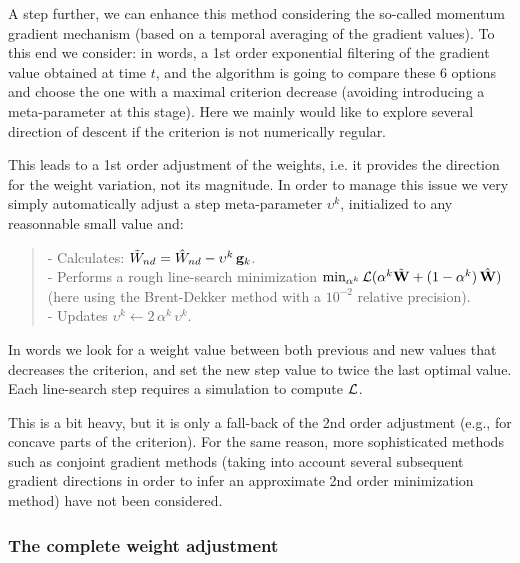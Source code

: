 A step further, we can enhance this method considering the so-called momentum gradient mechanism (based on a temporal averaging of the gradient values). To this end we consider:
in words, a 1st order exponential filtering of the gradient value obtained at time $t$, and the algorithm is going to compare these 6 options and choose the one with a maximal criterion decrease (avoiding introducing a meta-parameter at this stage). Here we mainly would like to explore several direction of descent if the criterion is not numerically regular.

This leads to a 1st order adjustment of the weights, i.e. it provides the direction for the weight variation, not its magnitude. In order to manage this issue we very simply automatically adjust a step meta-parameter $\upsilon^k$, initialized to any reasonnable small value and:\begin{quotation}{\small \noindent
- Calculates: $\tilde{W}_{nd} = \hat{W}_{nd} - \upsilon^k \, {\bf g}_k$.
\\\hspace{0.5cm} - Performs a rough line-search minimization $\min_{\alpha^k} {\cal L}(\alpha^k \tilde{\bf W} + (1 - \alpha^k) \, \hat{\bf W})$ (here using the Brent-Dekker method with a $10^{-2}$ relative precision).
\\\hspace{0.5cm} - Updates $\upsilon^k \leftarrow 2 \, \alpha^k \, \upsilon^k$.}\end{quotation}
In words we look for a weight value between both previous and new values that decreases the criterion, and set the new step value to twice the last optimal value. Each line-search step requires a simulation to compute ${\cal L}$. 

This is a bit heavy, but it is only a fall-back of the 2nd order adjustment (e.g., for concave parts of the criterion). For the same reason, more sophisticated methods such as conjoint gradient methods (taking into account several subsequent gradient directions in order to infer an approximate 2nd order minimization method) have not been considered.

\subsubsection*{The complete weight adjustment}

